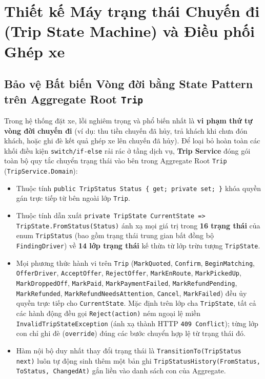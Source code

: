 \documentclass[12pt,a4paper]{article}
\begin{document}
\section{Thiết kế Máy trạng thái Chuyến đi (Trip State Machine) và Điều phối Ghép xe}

\subsection{Bảo vệ Bất biến Vòng đời bằng State Pattern trên Aggregate Root \texttt{Trip}}
Trong hệ thống đặt xe, lỗi nghiêm trọng và phổ biến nhất là \textbf{vi phạm thứ tự vòng đời chuyến đi} (ví dụ: thu tiền chuyến đã hủy, trả khách khi chưa đón khách, hoặc ghi đè kết quả ghép xe lên chuyến đã hủy). Để loại bỏ hoàn toàn các khối điều kiện \texttt{switch/if-else} rải rác ở tầng dịch vụ, \textbf{Trip Service} đóng gói toàn bộ quy tắc chuyển trạng thái vào bên trong Aggregate Root \texttt{Trip} (\texttt{TripService.Domain}):
\begin{itemize}[nosep]
    \item Thuộc tính \texttt{public TripStatus Status \{ get; private set; \}} khóa quyền gán trực tiếp từ bên ngoài lớp \texttt{Trip}.
    \item Thuộc tính dẫn xuất \texttt{private TripState CurrentState => TripState.FromStatus(Status)} ánh xạ mọi giá trị trong \textbf{16 trạng thái} của enum \texttt{TripStatus} (bao gồm trạng thái trung gian bất đồng bộ \texttt{FindingDriver}) về \textbf{14 lớp trạng thái} kế thừa từ lớp trừu tượng \texttt{TripState}.
    \item Mọi phương thức hành vi trên \texttt{Trip} (\texttt{MarkQuoted}, \texttt{Confirm}, \texttt{BeginMatching}, \texttt{OfferDriver}, \texttt{AcceptOffer}, \texttt{RejectOffer}, \texttt{MarkEnRoute}, \texttt{MarkPickedUp}, \texttt{MarkDroppedOff}, \texttt{MarkPaid}, \texttt{MarkPaymentFailed}, \texttt{MarkRefundPending}, \texttt{MarkRefunded}, \texttt{MarkRefundNeedsAttention}, \texttt{Cancel}, \texttt{MarkFailed}) đều ủy quyền trực tiếp cho \texttt{CurrentState}. Mặc định trên lớp cha \texttt{TripState}, tất cả các hành động đều gọi \texttt{Reject(action)} ném ngoại lệ miền \texttt{InvalidTripStateException} (ánh xạ thành HTTP \texttt{409 Conflict}); từng lớp con chỉ ghi đè (\texttt{override}) đúng các bước chuyển hợp lệ từ trạng thái đó.
    \item Hàm nội bộ duy nhất thay đổi trạng thái là \texttt{TransitionTo(TripStatus next)} luôn tự động sinh thêm một bản ghi \texttt{TripStatusHistory(FromStatus, ToStatus, ChangedAt)} gắn liền vào danh sách con của Aggregate.
\end{itemize}
\end{document}
